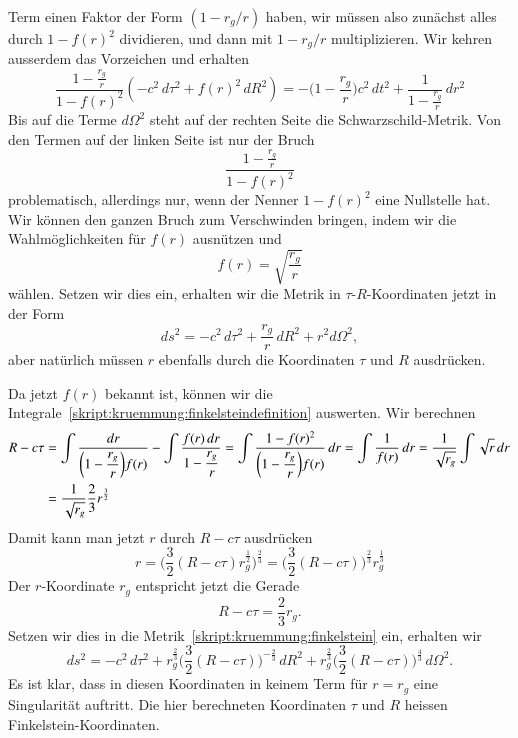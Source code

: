 Term einen Faktor der Form $(1-r_g/r)$ haben, wir müssen also zunächst
alles durch $1-f(r)^2$ dividieren, und dann mit $1-r_g/r$ multiplizieren.
Wir kehren ausserdem das Vorzeichen und erhalten
\[
\frac{\displaystyle 1-\frac{r_g}{r}}{1-f(r)^2}
(-c^2\,d\tau^2 + f(r)^2\,dR^2)
=
-\biggl(1-\frac{r_g}{r}\biggr)c^2\,dt^2
+\frac{1}{\displaystyle 1-\frac{r_g}{r}}\,dr^2
\]
Bis auf die Terme $d\Omega^2$ steht auf der rechten Seite die
Schwarzschild-Metrik.
Von den Termen auf der linken Seite ist nur der Bruch
\[
\frac{\displaystyle 1-\frac{r_g}{r}}{1-f(r)^2}
\]
problematisch, allerdings nur, wenn der Nenner $1-f(r)^2$ eine
Nullstelle hat.
Wir können den ganzen Bruch zum Verschwinden bringen, indem wir die
Wahlmöglichkeiten für $f(r)$ ausnützen und 
\[
f(r)=\sqrt{\frac{r_g}{r}}
\]
wählen.
Setzen wir dies ein, erhalten wir die Metrik in $\tau$-$R$-Koordinaten
jetzt in der Form
\begin{equation}
ds^2
=
-c^2\,d\tau^2 + \frac{r_g}{r}\,dR^2 + r^2 d\Omega^2,
\label{skript:kruemmung:finkelstein}
\end{equation}
aber natürlich müssen $r$ ebenfalls durch die Koordinaten $\tau$ und $R$
ausdrücken.

Da jetzt $f(r)$ bekannt ist, können wir die
Integrale~\eqref{skript:kruemmung:finkelsteindefinition} auswerten.
Wir berechnen
\begin{align*}
R-c\tau
&=
\int\frac{dr}{\displaystyle \biggl(1-\frac{r_g}{r}\biggr)f(r)}
- \int\frac{f(r)\,dr}{\displaystyle 1-\frac{r_g}{r}}
=
\int\frac{1-f(r)^2}{\displaystyle\biggl(1-\frac{r_g}{r}\biggr) f(r)}\,dr
=
\int\frac{1}{f(r)}\,dr
=
\frac{1}{\sqrt{\mathstrut r_g}}\int\sqrt{\mathstrut r}\,dr
\\
&=
\frac{1}{\sqrt{\mathstrut r_g}} \frac{2}{3}r^{\frac{3}{2}}
\end{align*}
Damit kann man jetzt $r$ durch $R-c\tau$ ausdrücken
\[
r
=
\biggl(\frac{3}{2}(R-c\tau)r_g^{\frac{1}{2}}\biggr)^{\frac23}
=
\biggl(\frac{3}{2}(R-c\tau)\biggr)^{\frac23} r_g^{\frac13}
\]
Der $r$-Koordinate $r_g$ entspricht jetzt die Gerade
\[
R-c\tau = \frac23 r_g.
\]
Setzen wir dies in die Metrik~\eqref{skript:kruemmung:finkelstein}
ein, erhalten wir
\[
ds^2
=
-c^2 \,d\tau^2
+r_g^{\frac23}\biggl(\frac32(R-c\tau)\biggr)^{-\frac23}\,dR^2
+ r_g^{\frac23}\biggl(\frac32(R-c\tau)\biggr)^{\frac43}\,d\Omega^2.
\]
Es ist klar, dass in diesen Koordinaten in keinem Term für $r=r_g$
eine Singularität auftritt.
Die hier berechneten Koordinaten $\tau$ und $R$ heissen
Finkelstein-Koordinaten.

